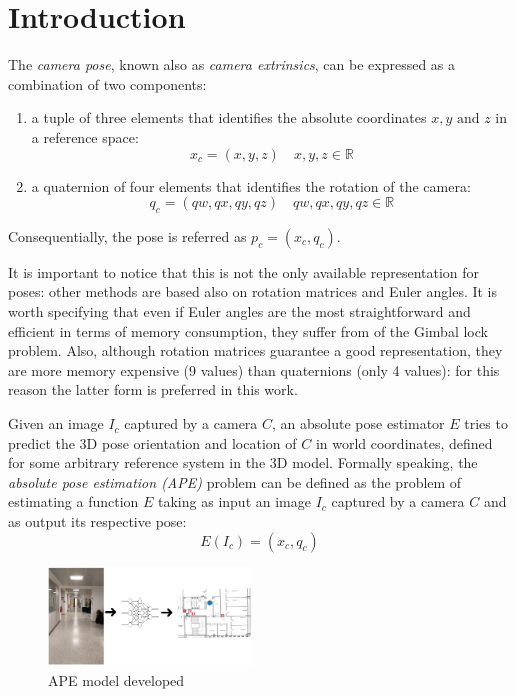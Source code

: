 \section{Introduction}
The \emph{camera pose}, known also as \emph{camera extrinsics}, can be expressed as a combination of two components:
\begin{enumerate}
    \item a tuple of three elements that identifies the absolute coordinates $x,y\text{ and }z$ in a reference space:
          \begin{equation}
              x_c=(x,y,z)\quad x,y,z \in \mathbb{R}
              \label{eq:absolute-position-definition}
          \end{equation}
    \item a quaternion of four elements that identifies the rotation of the camera:
          \begin{equation}
              q_c=(qw, qx, qy, qz)\quad qw,qx,qy,qz \in \mathbb{R}
              \label{eq:quaternion-as-rotation-definition}
          \end{equation}

\end{enumerate}
Consequentially, the pose is referred as $p_c=(x_c, q_c)$.

It is important to notice that this is not the only available representation for poses: other methods are based also on rotation matrices and Euler angles. It is worth specifying that even if Euler angles are the most straightforward and efficient in terms of memory consumption, they suffer from of the Gimbal lock problem. Also, although rotation matrices guarantee a good representation, they are more memory expensive (9 values) than quaternions (only 4 values): for this reason the latter form is preferred in this work.

Given an image $I_c$ captured by a camera $C$, an absolute pose estimator $E$ tries to predict the 3D pose orientation and location of $C$ in world coordinates, defined for some arbitrary reference system in the 3D model. Formally speaking, the \emph{absolute pose estimation (APE)} problem can be defined as the problem of estimating a function $E$ taking as input an image $I_c$ captured by a camera $C$ and as output its respective pose:
\begin{equation}
    E(I_c) = (x_c, q_c)
    \label{eq:absolute-pose-estimation-task}
\end{equation}

\begin{figure}[h]
    \begin{center}
        \includegraphics[width=0.48\textwidth]{./imgs/introduction_example.png}
    \end{center}
    \caption{APE model developed}
    \label{fig:introduction-example}
\end{figure}

